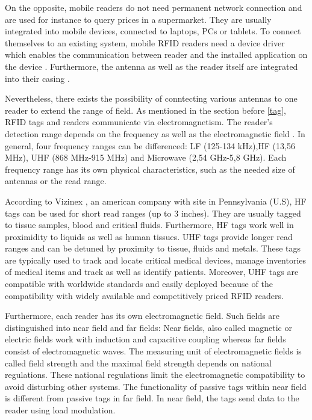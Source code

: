 On the opposite, mobile readers do not need permanent network connection and are used for instance to query prices in a supermarket. They are usually integrated into mobile devices, connected to laptops, \ac{PC}s or tablets. To connect themselves to an existing system, mobile RFID readers need a device driver which enables the communication between reader and the installed application on the device \cite[p.133 ff.]{mobile}. Furthermore, the antenna as well as the reader itself are integrated into their casing \cite[p.17 ff.]{fokus}.

Nevertheless, there exists the possibility of conntecting various antennas to one reader to extend the range of field.
As mentioned in the section before \ref{tag}, RFID tags and readers communicate via electromagnetism. The reader's detection range depends on the frequency as well as the electromagnetic field \cite{henrici}. In general, four frequency ranges can be differenced: \ac{LF} (125-134 kHz),\ac{HF} (13,56 MHz), UHF (868 MHz-915 MHz) and Microwave (2,54 GHz-5,8 GHz). Each frequency range has its own physical characteristics, such as the needed size of antennas or the read range.

According to Vizinex \cite{vizinex}, an american company with site in Pennsylvania (U.S), HF tags can be used for short read ranges (up to 3 inches). They are usually tagged to tissue samples, blood and critical fluids. Furthermore, HF tags work well in proximidity to liquids as well as human tissues. UHF tags provide longer read ranges and can be detuned by proximity to tissue, fluids and metals. These tags are typically used to track and locate critical medical devices, manage inventories of medical items and track as well as identify patients. Moreover, UHF tags are compatible with worldwide standards and easily deployed because of the compatibility with widely available and competitively priced RFID readers.

Furthermore, each reader has its own electromagnetic field. Such fields are distinguished into near field and far fields: Near fields, also called magnetic or electric fields work with induction and capacitive coupling whereas far fields consist of electromagnetic waves. The measuring unit of electromagnetic fields is called field strength and the maximal field strength depends on national regulations. These national regulations limit the electromagnetic compatibility to avoid disturbing other systems. The functionality of passive tags within near field is different from passive tags in far field. In near field, the tags send data to the reader using load modulation. 


